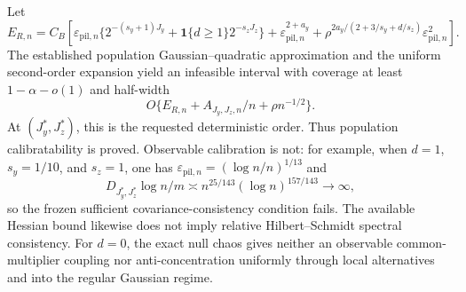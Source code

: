 Let
\[
E_{R,n}=C_B\left[
\varepsilon_{\mathrm{pil},n}\{2^{-(s_y+1)J_y}+\mathbf 1\{d\ge1\}2^{-s_zJ_z}\}
+\varepsilon_{\mathrm{pil},n}^{2+a_y}
+\rho^{2a_y/(2+3/s_y+d/s_z)}\varepsilon_{\mathrm{pil},n}^2
\right].
\]
The established population Gaussian--quadratic approximation and the uniform second-order expansion yield an infeasible interval with coverage at least \(1-\alpha-o(1)\) and half-width
\[
O\{E_{R,n}+A_{J_y,J_z,n}/n+\rho n^{-1/2}\}.
\]
At \((J_y^*,J_z^*)\), this is the requested deterministic order. Thus population calibratability is proved. Observable calibration is not: for example, when \(d=1\), \(s_y=1/10\), and \(s_z=1\), one has \(\varepsilon_{\mathrm{pil},n}=(\log n/n)^{1/13}\) and
\[
D_{J_y^*,J_z^*}\log n/m
\asymp n^{25/143}(\log n)^{157/143}\to\infty,
\]
so the frozen sufficient covariance-consistency condition fails. The available Hessian bound likewise does not imply relative Hilbert--Schmidt spectral consistency. For \(d=0\), the exact null chaos gives neither an observable common-multiplier coupling nor anti-concentration uniformly through local alternatives and into the regular Gaussian regime.